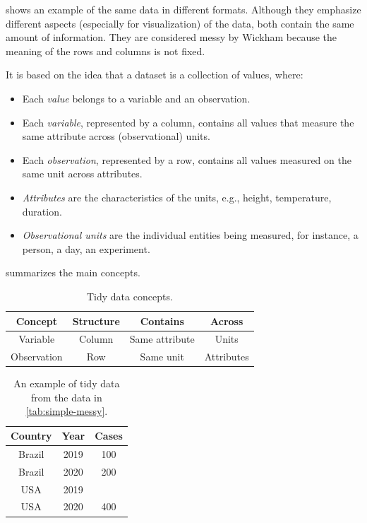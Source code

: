  shows an example of the same data in different formats.  Although
they emphasize different aspects (especially for visualization) of the data, both contain
the same amount of information.  They are considered messy by Wickham because the meaning
of the rows and columns is not fixed.

It is based on the idea that a dataset is a collection of values, where:
\begin{itemize}
  \itemsep0em
  \item Each \emph{value} belongs to a variable and an observation.
  \item Each \emph{variable}, represented by a column, contains all values that measure
    the same attribute across (observational) units.
  \item Each \emph{observation}, represented by a row, contains all values measured on the
    same unit across attributes.
  \item \emph{Attributes} are the characteristics of the units, e.g., height, temperature,
    duration.
  \item \emph{Observational units} are the individual entities being measured, for
    instance, a person, a day, an experiment.
\end{itemize}
 summarizes the main concepts.

\begin{table}
  \centering
  \begin{tabular}{cccc}
    \toprule
    \textbf{Concept} & \textbf{Structure} & \textbf{Contains} & \textbf{Across} \\
    \midrule
    Variable & Column & Same attribute & Units \\
    Observation & Row & Same unit & Attributes \\
    \bottomrule
  \end{tabular}
  \caption{Tidy data concepts.}
  \label{tab:tidy}
\end{table}

\begin{table}
  \centering
  \begin{tabular}{ccc}
    \toprule
    \textbf{Country} & \textbf{Year} & \textbf{Cases} \\
    \midrule
    Brazil & 2019 & 100 \\
    Brazil & 2020 & 200 \\
    USA & 2019 & \\
    USA & 2020 & 400 \\
    \bottomrule
  \end{tabular}
  \caption{
  An example of tidy data from the data in \cref{tab:simple-messy}.
  }
  \label{tab:simple-tidy}
\end{table}


